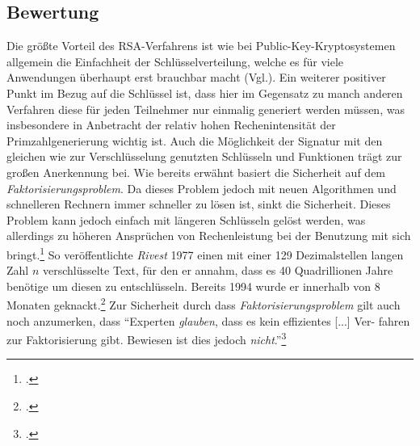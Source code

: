\documentclass{scrarticle} %
\begin{document}
    \subsection{Bewertung} \label{sec:bewertung}
        Die größte Vorteil des RSA-Verfahrens ist wie bei Public-Key-Kryptosystemen allgemein die Einfachheit der Schlüsselverteilung, welche es für viele Anwendungen überhaupt erst brauchbar macht (Vgl.\cite[285]{dankmeier2006}). Ein weiterer positiver Punkt im Bezug auf die Schlüssel ist, dass hier im Gegensatz zu manch anderen Verfahren diese für jeden Teilnehmer nur einmalig generiert werden müssen, was insbesondere in Anbetracht der relativ hohen Rechenintensität der Primzahlgenerierung wichtig ist. Auch die Möglichkeit der Signatur mit den gleichen wie zur Verschlüsselung genutzten Schlüsseln und Funktionen trägt zur großen Anerkennung bei. Wie bereits erwähnt basiert die Sicherheit auf dem \emph{Faktorisierungsproblem}. Da dieses Problem jedoch mit neuen Algorithmen und schnelleren Rechnern immer schneller zu lösen ist, sinkt die Sicherheit. Dieses Problem kann jedoch einfach mit längeren Schlüsseln gelöst werden, was allerdings zu höheren Ansprüchen von Rechenleistung bei der Benutzung mit sich bringt.\footcite[Vgl.][]{zum2020} So veröffentlichte \emph{Rivest} 1977 einen mit einer 129 Dezimalstellen langen Zahl $n$ verschlüsselte Text, für den er annahm, dass es 40 Quadrillionen Jahre benötige um diesen zu entschlüsseln. Bereits 1994 wurde er innerhalb von 8 Monaten geknackt.\footcite[Vgl.][73]{watjen2008} Zur Sicherheit durch dass \emph{Faktorisierungsproblem} gilt auch noch anzumerken, dass \enquote{Experten \emph{glauben}, dass es kein effizientes [...] Ver-
        fahren zur Faktorisierung gibt. Bewiesen ist dies jedoch \emph{nicht}.}\footcite[80]{ertel2003}
\end{document}
